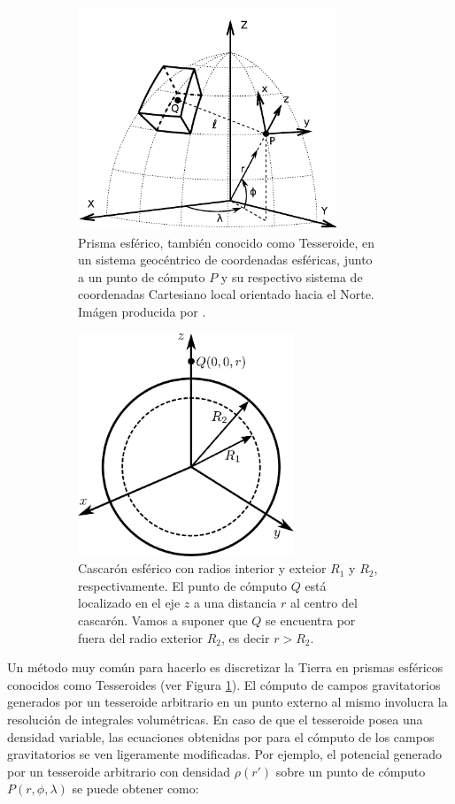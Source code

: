 \documentclass[a4paper,10pt]{article}
\begin{document}
\begin{figure}
    \begin{subfigure}[t]{0.5\textwidth}
    \centering
    \includegraphics[height=18em]{../manuscript/figures/tesseroid-uieda.pdf}
    \caption{
        Prisma esférico, también conocido como Tesseroide, en un sistema geocéntrico de coordenadas esféricas, junto a un punto de cómputo $P$ y su respectivo sistema de coordenadas Cartesiano local orientado hacia el Norte. Imágen producida por \citet{Uieda2015}.
    }
    \label{fig:tesseroid-uieda}
    \end{subfigure}
    \quad
    \begin{subfigure}[t]{0.5\textwidth}
    \centering
    \includegraphics[height=18em]{../manuscript/figures/spherical-shell.pdf}
    \caption{
        Cascarón esférico con radios interior y exteior $R_1$ y $R_2$, respectivamente. El punto de cómputo $Q$ está localizado en el eje $z$ a una distancia $r$ al centro del cascarón. Vamos a suponer que $Q$ se encuentra por fuera del radio exterior $R_2$, es decir $r > R_2$.
    }
    \label{fig:spherical-shell}
    \end{subfigure}
    \caption{}
\end{figure}

Un método muy común para hacerlo es discretizar la Tierra en prismas esféricos conocidos como Tesseroides (ver Figura \ref{fig:tesseroid-uieda}).
El cómputo de campos gravitatorios generados por un tesseroide arbitrario en un punto externo al mismo involucra la resolución de integrales volumétricas.
En caso de que el tesseroide posea una densidad variable, las ecuaciones obtenidas por \citet{Grombein2013} \citep[ver también][]{Uieda2016} para el cómputo de los campos gravitatorios se ven ligeramente modificadas. Por ejemplo, el potencial generado por un tesseroide arbitrario con densidad $\rho(r')$ sobre un punto de cómputo $P(r, \phi, \lambda)$ se puede obtener como:
\end{document}
